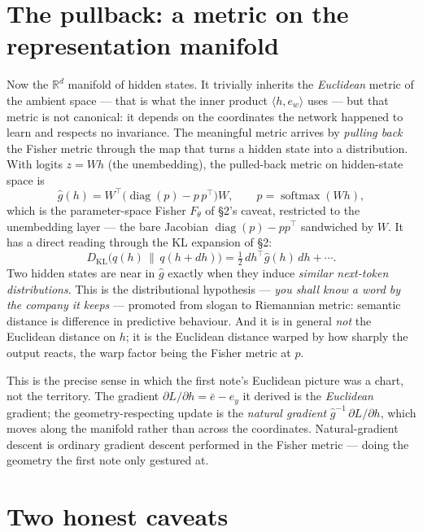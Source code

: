 \documentclass[11pt]{article}
\begin{document}
\section{The pullback: a metric on the representation manifold}

Now the $\mathbb{R}^d$ manifold of hidden states. It trivially inherits the \emph{Euclidean}
metric of the ambient space --- that is what the inner product $\langle h, e_w\rangle$ uses ---
but that metric is not canonical: it depends on the coordinates the network happened to learn
and respects no invariance. The meaningful metric arrives by \emph{pulling back} the Fisher
metric through the map that turns a hidden state into a distribution. With logits $z = Wh$ (the
unembedding), the pulled-back metric on hidden-state space is
\[
  \hat g(h) = W^{\top} \bigl(\operatorname{diag}(p) - p\,p^{\top}\bigr) W,
  \qquad p = \operatorname{softmax}(Wh),
\]
which is the parameter-space Fisher $F_\theta$ of \S2's caveat, restricted to the unembedding
layer --- the bare Jacobian $\operatorname{diag}(p) - p p^{\top}$ sandwiched by $W$. It has a
direct reading through the KL expansion of \S2:
\[
  D_{\mathrm{KL}}\bigl(q(h) \,\|\, q(h+dh)\bigr) = \tfrac12\, dh^{\top}\hat g(h)\, dh + \cdots.
\]
Two hidden states are near in $\hat g$ exactly when they induce \emph{similar next-token
distributions}. This is the distributional hypothesis --- \emph{you shall know a word by the
company it keeps} --- promoted from slogan to Riemannian metric: semantic distance is
difference in predictive behaviour. And it is in general \emph{not} the Euclidean distance on
$h$; it is the Euclidean distance warped by how sharply the output reacts, the warp factor
being the Fisher metric at $p$.

\begin{insight}
This is the precise sense in which the first note's Euclidean picture was a chart, not the
territory. The gradient $\partial L/\partial h = \bar e - e_y$ it derived is the
\emph{Euclidean} gradient; the geometry-respecting update is the \emph{natural gradient}
$\hat g^{-1}\,\partial L/\partial h$, which moves along the manifold rather than across the
coordinates. Natural-gradient descent is ordinary gradient descent performed in the Fisher
metric --- doing the geometry the first note only gestured at.
\end{insight}

\section{Two honest caveats}
\end{document}
